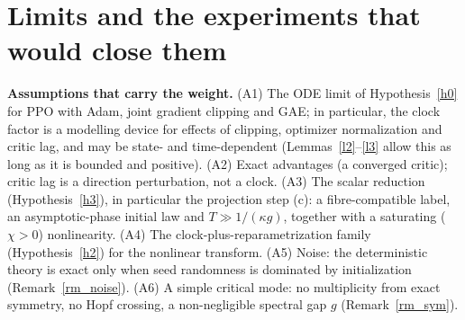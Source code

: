 \documentclass[11pt]{article}
\theoremstyle{definition}
\theoremstyle{remark}
\begin{document}
\section{Limits and the experiments that would close them}

\textbf{Assumptions that carry the weight.} (A1) The ODE limit of Hypothesis~\ref{h0} for PPO with Adam, joint gradient clipping and GAE; in particular, the clock factor is a modelling device for effects of clipping, optimizer normalization and critic lag, and may be state- and time-dependent (Lemmas~\ref{l2}--\ref{l3} allow this as long as it is bounded and positive). (A2) Exact advantages (a converged critic); critic lag is a direction perturbation, not a clock. (A3) The scalar reduction (Hypothesis~\ref{h3}), in particular the projection step (c): a fibre-compatible label, an asymptotic-phase initial law and $T\gg1/(\kappa g)$, together with a saturating ($\chi>0$) nonlinearity. (A4) The clock-plus-reparametrization family (Hypothesis~\ref{h2}) for the nonlinear transform. (A5) Noise: the deterministic theory is exact only when seed randomness is dominated by initialization (Remark~\ref{rm_noise}). (A6) A simple critical mode: no multiplicity from exact symmetry, no Hopf crossing, a non-negligible spectral gap $g$ (Remark~\ref{rm_sym}).
\end{document}
